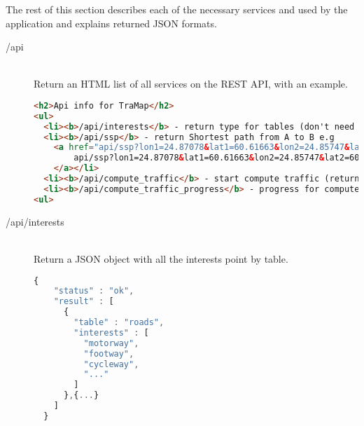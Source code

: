The rest of this section describes each of the necessary services and used by the application and explains returned JSON formats.

\begin{description}

  \item[/api] \hfill \\ 
    Return an HTML list of all services on the REST API, with an example. \\
    \begin{lstlisting}[language=html]
<h2>Api info for TraMap</h2>
<ul>
  <li><b>/api/interests</b> - return type for tables (don't need any parameters)</li>
  <li><b>/api/ssp</b> - return Shortest path from A to B e.g
    <a href="api/ssp?lon1=24.87078&lat1=60.61663&lon2=24.85747&lat2=60.63003">
        api/ssp?lon1=24.87078&lat1=60.61663&lon2=24.85747&lat2=60.63003
    </a></li>
  <li><b>/api/compute_traffic</b> - start compute traffic (return info about start compute)</li>
  <li><b>/api/compute_traffic_progress</b> - progress for compute traffic</li>
<ul>
    \end{lstlisting}

  \item[/api/interests] \hfill \\ 
    Return a JSON object with all the interests point by table. \\
    \begin{lstlisting}[language=javascript]
  {
    "status" : "ok",
    "result" : [
      {
        "table" : "roads",
        "interests" : [
          "motorway",
          "footway",
          "cycleway",
          "..."
        ]
      },{...}
    ]
  }
    \end{lstlisting}


\end{description}

